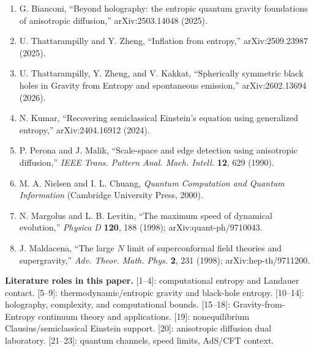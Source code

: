 \documentclass[
  11pt,
]{article}
\newcounter{none} %
\begin{document}
\begin{enumerate}
\item
  G. Bianconi, ``Beyond holography: the entropic quantum gravity foundations of anisotropic diffusion,'' arXiv:2503.14048 (2025).
\item
  U. Thattarampilly and Y. Zheng, ``Inflation from entropy,'' arXiv:2509.23987 (2025).
\item
  U. Thattarampilly, Y. Zheng, and V. Kakkat, ``Spherically symmetric black holes in Gravity from Entropy and spontaneous emission,'' arXiv:2602.13694 (2026).
\item
  N. Kumar, ``Recovering semiclassical Einstein's equation using generalized entropy,'' arXiv:2404.16912 (2024).
\item
  P. Perona and J. Malik, ``Scale-space and edge detection using anisotropic diffusion,'' \emph{IEEE Trans. Pattern Anal. Mach. Intell.} \textbf{12}, 629 (1990).
\item
  M. A. Nielsen and I. L. Chuang, \emph{Quantum Computation and Quantum Information} (Cambridge University Press, 2000).
\item
  N. Margolus and L. B. Levitin, ``The maximum speed of dynamical evolution,'' \emph{Physica D} \textbf{120}, 188 (1998); arXiv:quant-ph/9710043.
\item
  J. Maldacena, ``The large \(N\) limit of superconformal field theories and supergravity,'' \emph{Adv. Theor. Math. Phys.} \textbf{2}, 231 (1998); arXiv:hep-th/9711200.
\end{enumerate}

\textbf{Literature roles in this paper.} {[}1--4{]}: computational entropy and Landauer contact. {[}5--9{]}: thermodynamic/entropic gravity and black-hole entropy. {[}10--14{]}: holography, complexity, and computational bounds. {[}15--18{]}: Gravity-from-Entropy continuum theory and applications. {[}19{]}: nonequilibrium Clausius/semiclassical Einstein support. {[}20{]}: anisotropic diffusion dual laboratory. {[}21--23{]}: quantum channels, speed limits, AdS/CFT context.
\end{document}

